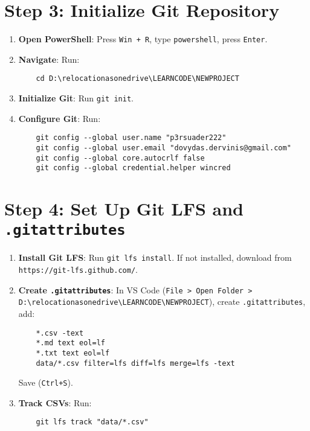 \documentclass[a4paper,12pt]{article}
\begin{document}
\section{Step 3: Initialize Git Repository}
\begin{enumerate}[label=\arabic*.]
    \item \textbf{Open PowerShell}: Press \texttt{Win + R}, type \texttt{powershell}, press \texttt{Enter}.
    \item \textbf{Navigate}: Run:
    \begin{verbatim}
    cd D:\relocationasonedrive\LEARNCODE\NEWPROJECT
    \end{verbatim}
    \item \textbf{Initialize Git}: Run \texttt{git init}.
    \item \textbf{Configure Git}: Run:
    \begin{verbatim}
    git config --global user.name "p3rsuader222"
    git config --global user.email "dovydas.dervinis@gmail.com"
    git config --global core.autocrlf false
    git config --global credential.helper wincred
    \end{verbatim}
\end{enumerate}

\section{Step 4: Set Up Git LFS and \texttt{.gitattributes}}
\begin{enumerate}[label=\arabic*.]
    \item \textbf{Install Git LFS}: Run \texttt{git lfs install}. If not installed, download from \texttt{https://git-lfs.github.com/}.
    \item \textbf{Create \texttt{.gitattributes}}: In VS Code (\texttt{File > Open Folder > D:\textbackslash relocationasonedrive\textbackslash LEARNCODE\textbackslash NEWPROJECT}), create \texttt{.gitattributes}, add:
    \begin{verbatim}
    *.csv -text
    *.md text eol=lf
    *.txt text eol=lf
    data/*.csv filter=lfs diff=lfs merge=lfs -text
    \end{verbatim}
    Save (\texttt{Ctrl+S}).
    \item \textbf{Track CSVs}: Run:
    \begin{verbatim}
    git lfs track "data/*.csv"
    \end{verbatim}
\end{enumerate}
\end{document}
